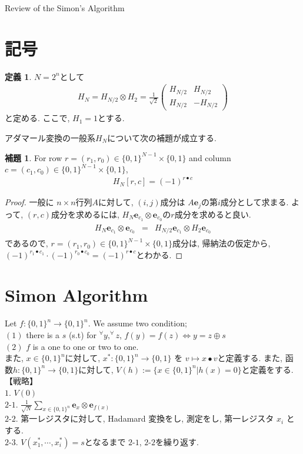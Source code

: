 \documentclass{jsarticle}
\theoremstyle{definition}
\newtheorem{definition}[theorem]{定義}
\newtheorem{lemma}[theorem]{補題}
\begin{document}
Review of the Simon's Algorithm
\section{記号}
\begin{definition}
$N=2^n$として
\begin{align}\label{Hadamar}
H_N=H_{N/2}\otimes H_2
=\frac{1}{\sqrt{2} } \left( \begin{array}{cc}
H_{N/2} & H_{N/2} \\
H_{N/2} & -H_{N/2} 
\end{array}\right)
\end{align}
と定める. ここで, $H_1=1$とする.
\end{definition}
アダマール変換の一般系$H_N$について次の補題が成立する.
\begin{lemma}
For row  $r=(r_1,r_0) \in \{0,1\}^{N-1} \times \{0,1\}$ and column $c=(c_1,c_0) \in \{0,1 \}^{N-1} \times \{0,1\}$, 
\begin{align}
H_{N}[r,c]=(-1)^{r \bullet c }
\end{align}
\end{lemma}
\begin{proof}
一般に $n \times n$行列$A$に対して, $(i,j)$成分は $A\mathbf{e}_j $の第$i$成分として求まる. よって, $(r,c)$成分を求めるには, $H_{N} \mathbf{e}_{c_1} \otimes \mathbf{e}_{c_0} $の$r$成分を求めると良い.
\begin{align}
\begin{array}{lll}
H_{N} \mathbf{e}_{c_1} \otimes \mathbf{e}_{c_0}&=&H_{N/2} \mathbf{e}_{c_1}\otimes H_2  \mathbf{e}_{c_0} 
\end{array}
\end{align}
であるので, $ r=(r_1,r_0) \in \{0,1\}^{N-1} \times \{0,1\} $成分は, 帰納法の仮定から, $(-1)^{r_1 \bullet c_1} \cdot (-1)^{r_0 \bullet c_0}=(-1)^{r\bullet c}$とわかる.
\end{proof}

\section{Simon Algorithm}
Let $f:\{0,1\}^n \rightarrow \{0,1\}^n $. We  assume two condition;\\
$(1)$ there is a $s$  (s.t)  for  $^{\forall}y, ^{\forall}z $,    $f(y)=f(z) \Leftrightarrow  y=z \oplus s$\\
$(2)$ $f$ is a one to one or two to one.
\ \\
また, $x\in \{0,1 \}^n$に対して,  $x^* : \{0,1\}^n \rightarrow \{0,1\}$ を $v \mapsto  x \bullet v $と定義する. また, 函数$h: \{0,1\}^n \rightarrow \{0,1\} $に対して, $V(h):=\{x \in \{0,1\}^n | h(x)=0 \}$と定義をする.
\  \\
【戦略】\\
$1$.  $V(0)$\\
$2$-$1$.  $\frac{1}{\sqrt{N}} \displaystyle\sum_{x\in \{0,1\}^n } \mathbf{e}_x \otimes \mathbf{e}_{f(x)}$ \\  
$2$-$2$. 第一レジスタに対して, Hadamard 変換をし, 測定をし, 第一レジスタ $x_i$ とする. \\
$2$-$3$. $V(x^*_1, \cdots , x^*_i)=s$となるまで $2$-$1$, $2$-$2$を繰り返す. \\
\end{document}
